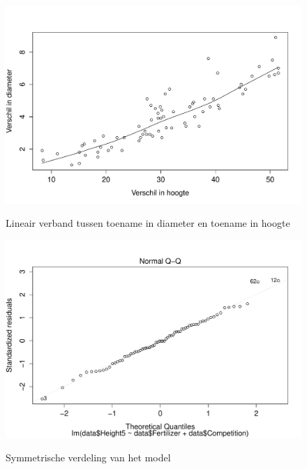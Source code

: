 \documentclass[11pt, a4paper]{article}
\begin{document}
\begin{figure}
	\begin{center}		
		\vspace{-0.5cm}
		\includegraphics[scale=0.45]{scatter_c.pdf}
		\caption{Lineair verband tussen toename in diameter en toename in hoogte}
		\label{scatc}
		\vspace{-0.5cm}
		\includegraphics[scale=0.4]{qqplot_d.pdf}
		\caption{Symmetrische verdeling van het model}
		\label{qqplotd}
		\vspace{-0.5cm}
	\end{center}
\end{figure}
\end{document}
